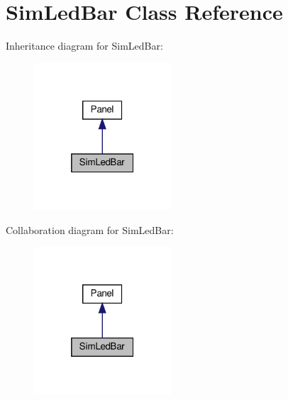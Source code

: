 \hypertarget{classSimLedBar}{}\section{Sim\+Led\+Bar Class Reference}
\label{classSimLedBar}


Inheritance diagram for Sim\+Led\+Bar\+:
\nopagebreak
\begin{figure}[H]
\begin{center}
\leavevmode
\includegraphics[width=145pt]{classSimLedBar__inherit__graph}
\end{center}
\end{figure}


Collaboration diagram for Sim\+Led\+Bar\+:
\nopagebreak
\begin{figure}[H]
\begin{center}
\leavevmode
\includegraphics[width=145pt]{classSimLedBar__coll__graph}
\end{center}
\end{figure}
